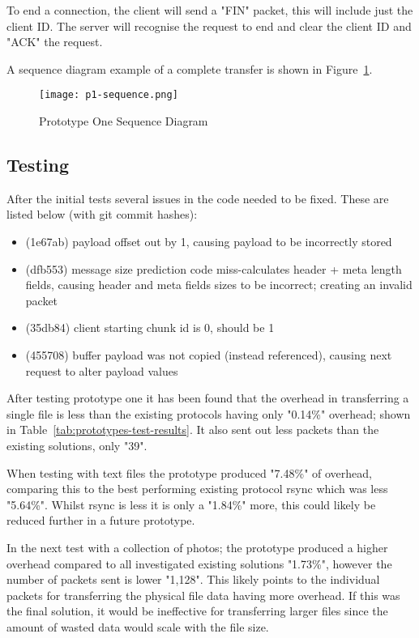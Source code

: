 To end a connection, the client will send a "FIN" packet, this will include just the client ID. The server will recognise the request to end and clear the client ID and "ACK" the request.

A sequence diagram example of a complete transfer is shown in Figure~\ref{fig:p1-sequence}.

\newpage
\begin{figure}[h!]
    \centering
    \texttt{[image: p1-sequence.png]}
    \caption{Prototype One Sequence Diagram}
    \label{fig:p1-sequence}
\end{figure}
\newpage

\subsection*{Testing}
After the initial tests several issues in the code needed to be fixed. These are listed below (with git commit hashes):

\begin{itemize}
    \item (1e67ab) payload offset out by 1, causing payload to be incorrectly stored
    \item (dfb553) message size prediction code miss-calculates header + meta length fields, causing header and meta fields sizes to be incorrect; creating an invalid packet
    \item (35db84) client starting chunk id is 0, should be 1
    \item (455708) buffer payload was not copied (instead referenced), causing next request to alter payload values
\end{itemize}

After testing prototype one it has been found that the overhead in transferring a single file is less than the existing protocols having only "0.14\%" overhead; shown in Table~\ref{tab:prototypes-test-results}. It also sent out less packets than the existing solutions, only "39".

When testing with text files the prototype produced "7.48\%" of overhead, comparing this to the best performing existing protocol rsync which was less "5.64\%". Whilst rsync is less it is only a
"1.84\%" more, this could likely be reduced further in a future prototype.

In the next test with a collection of photos; the prototype produced a higher overhead compared to all investigated existing solutions "1.73\%", however the number of packets sent is lower "1,128". This likely points to the individual packets for transferring the physical file data having more overhead. If this was the final solution, it would be ineffective for transferring larger files since the amount of wasted data would scale with the file size.

